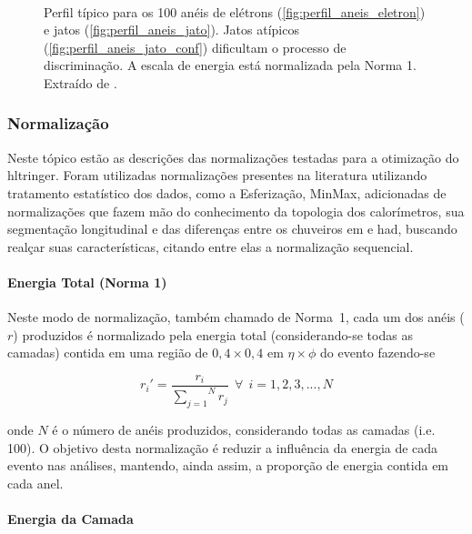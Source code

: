 \begin{figure}[ht!]
{  }\\
\caption[Perfil típico para os 100 anéis de elétrons e jatos.]{Perfil típico
para os 100 anéis de elétrons (\ref{fig:perfil_aneis_eletron}) e
jatos (\ref{fig:perfil_aneis_jato}). Jatos atípicos (\ref{fig:perfil_aneis_jato_conf}) 
dificultam o processo de discriminação. A escala de energia está normalizada
pela Norma 1. Extraído de \cite{tese_eduardo}.}
\end{figure}



\subsubsection{Normalização}
\label{sssec:preproc_norm}

Neste tópico estão as descrições das normalizações testadas para a otimização do
\gls{hltringer}. Foram utilizadas normalizações presentes na literatura
utilizando tratamento estatístico dos dados, como a Esferização, MinMax, 
adicionadas de normalizações que fazem mão do conhecimento da topologia dos calorímetros, 
sua segmentação longitudinal e das diferenças entre os chuveiros \gls{em} e \gls{had}, 
buscando realçar suas características, citando entre elas a normalização
sequencial.

\paragraph{Energia Total (Norma 1)}
\label{par:norm_norm1}

Neste modo de normalização, também chamado de Norma~1, cada um dos anéis ($r$) produzidos é normalizado pela energia total 
(considerando-se todas as camadas) contida em uma região de $0,4 \times 0,4$ em 
$\eta \times \phi$ do evento fazendo-se

\begin{equation}
r_{i}' = \frac{r_i}{\overset{N}{\underset{j=1}{\sum}} r_j}~~\forall~~i=1,2,3,...,N
\end{equation}

\noindent onde $N$ é o número de anéis produzidos, considerando todas as camadas (i.e. 100). 
O objetivo desta normalização é reduzir a influência da energia de cada evento nas análises, 
mantendo, ainda assim, a proporção de energia contida em cada anel.


\paragraph{Energia da Camada}
\label{par:norm_camada}

